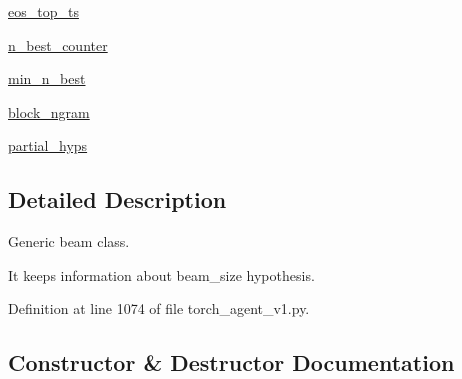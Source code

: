\begin{DoxyCompactItemize}
\item 
\hyperlink{classparlai_1_1agents_1_1legacy__agents_1_1seq2seq_1_1torch__agent__v1_1_1Beam_ab1d9fb1a27a4a96ea9293720eb812487}{eos\+\_\+top\+\_\+ts}
\item 
\hyperlink{classparlai_1_1agents_1_1legacy__agents_1_1seq2seq_1_1torch__agent__v1_1_1Beam_a44a03facdc6259db57720fcae9f9a6ed}{n\+\_\+best\+\_\+counter}
\item 
\hyperlink{classparlai_1_1agents_1_1legacy__agents_1_1seq2seq_1_1torch__agent__v1_1_1Beam_a65b34839f24c68fa76df61cff22e177e}{min\+\_\+n\+\_\+best}
\item 
\hyperlink{classparlai_1_1agents_1_1legacy__agents_1_1seq2seq_1_1torch__agent__v1_1_1Beam_aa2ba93350ee7aa9ab2ae5ba01c1c0c1e}{block\+\_\+ngram}
\item 
\hyperlink{classparlai_1_1agents_1_1legacy__agents_1_1seq2seq_1_1torch__agent__v1_1_1Beam_a35c45bf55c21713f720fffdaafc68081}{partial\+\_\+hyps}
\end{DoxyCompactItemize}


\subsection{Detailed Description}
\begin{DoxyVerb}Generic beam class.

It keeps information about beam_size hypothesis.
\end{DoxyVerb}
 

Definition at line 1074 of file torch\+\_\+agent\+\_\+v1.\+py.



\subsection{Constructor \& Destructor Documentation}
\mbox{\label{classparlai_1_1agents_1_1legacy__agents_1_1seq2seq_1_1torch__agent__v1_1_1Beam_af0f9f1c8fc21c9a00932129c2239b6a9}} 
